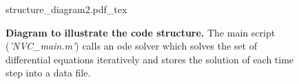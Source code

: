 \begin{figure}[h!]
  \centering
  \def\svgwidth{450pt} %
  \footnotesize
  {structure_diagram2.pdf_tex}
  \caption{\textbf{Diagram to illustrate the code structure.} The main script (\textit{'NVC\_main.m'}) calls an ode solver which solves the set of differential equations iteratively and stores the solution of each time step into a data file.}
\label{fig:Structure}
\end{figure}



